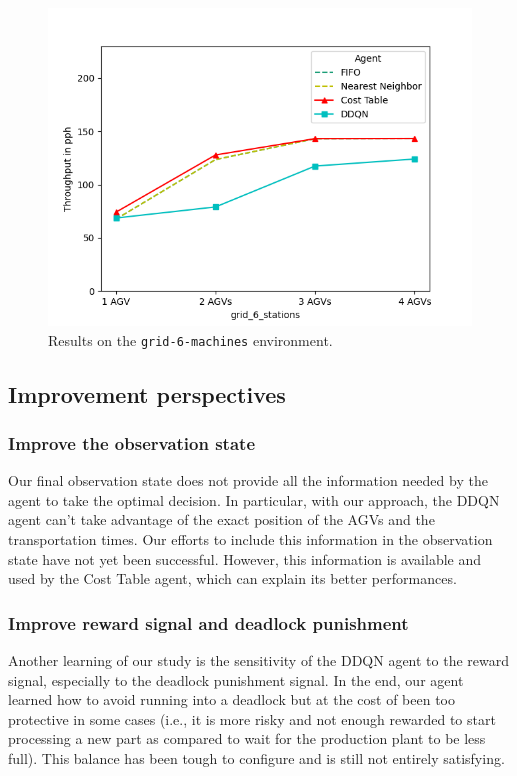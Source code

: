 \documentclass[sn-mathphys]{sn-jnl}
\begin{document}
\begin{figure}[ht]
  \includegraphics[width=1.0\textwidth]{results_grid_6_machines.png}
  \caption{Results on the \texttt{grid-6-machines} environment.}
  \label{fig:grid_6_machines_results}
\end{figure}

\subsection{Improvement perspectives}

\subsubsection{Improve the observation state}

Our final observation state does not provide all the information needed by the agent to take the optimal decision. In particular, with our approach, the DDQN agent can't take advantage of the exact position of the AGVs and the transportation times. Our efforts to include this information in the observation state have not yet been successful. However, this information is available and used by the Cost Table agent, which can explain its better performances.

\subsubsection{Improve reward signal and deadlock punishment}

Another learning of our study is the sensitivity of the DDQN agent to the reward signal, especially to the deadlock punishment signal. In the end, our agent learned how to avoid running into a deadlock but at the cost of been too protective in some cases (i.e., it is more risky and not enough rewarded to start processing a new part as compared to wait for the production plant to be less full). This balance has been tough to configure and is still not entirely satisfying.
\end{document}
